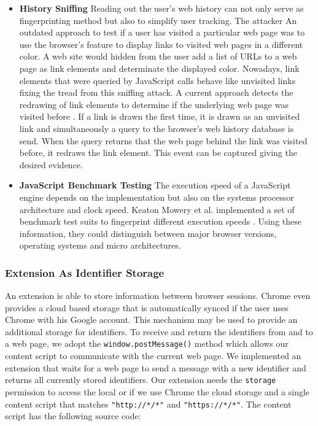 \begin{itemize}
		\item \textbf{History Sniffing} Reading out the user's web history can not only serve as fingerprinting method but also to simplify user tracking. The attacker  An outdated approach to test if a user has visited a particular web page was to use the browser's feature to display links to visited web pages in a different color. A web site would hidden from the user add a list of URLs to a web page as link elements and determinate the displayed color. Nowadays, link elements that were queried by JavaScript calls behave like unvisited links fixing the tread from this sniffing attack. A current approach detects the redrawing of link elements to determine if the underlying web page was visited before \cite{paulstone_historysniffing}. If a link is drawn the first time, it is drawn as an unvisited link and simultaneously a query to the browser's web history database is send. When the query returns that the web page behind the link was visited before, it redraws the link element. This event can be captured giving the desired evidence.
		
		\item \textbf{JavaScript Benchmark Testing} The execution speed of a JavaScript engine depends on the implementation but also on the systems processor architecture and clock
		speed. Keaton Mowery et al. implemented a set of benchmark test suits to fingerprint different execution speeds \cite{MBYS11}. Using these information, they could distinguish between major browser versions, operating systems and micro architectures. 
	\end{itemize}
	
	\subsubsection{Extension As Identifier Storage}
	
	An extension is able to store information between browser sessions. Chrome even provides a cloud based storage that is automatically synced if the user uses Chrome with his Google account. This mechanism may be used to provide an additional storage for identifiers. To receive and return the identifiers from and to a web page, we adopt the \texttt{window.postMessage()} method which allows our content script to communicate with the current web page. We implemented an extension that waits for a web page to send a  message with a new identifier and returns all currently stored identifiers. Our extension needs the \texttt{storage} permission to access the local or if we use Chrome the cloud storage and a single content script that matches \texttt{"http://*/*"} and \texttt{"https://*/*"}. The content script has the following source code: \\
	
